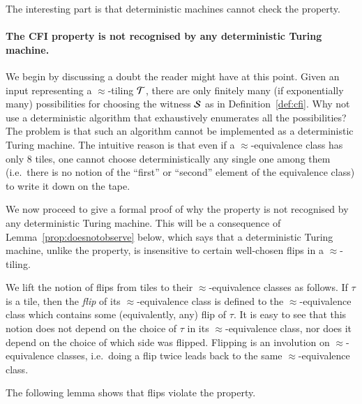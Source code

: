 The interesting part is that deterministic machines cannot check the \cfi property. 
\paragraph*{The CFI property is not recognised by any deterministic Turing machine.}
 We begin by discussing a doubt the reader might have at this point. Given an input representing a $\approx$-tiling ${\mathcal T}$, there are only finitely many (if exponentially many) possibilities for choosing the witness ${\mathcal S}$ as in Definition~\ref{def:cfi}. Why not use a deterministic algorithm that exhaustively enumerates all the possibilities? The problem is that such an algorithm cannot be implemented as a deterministic Turing machine. The intuitive reason is that even if a $\approx$-equivalence class has only 8 tiles, one cannot choose deterministically any single one among them (i.e.~there is no notion of the ``first'' or ``second'' element of the equivalence class) to write it down on the tape. 

We now proceed to give a formal proof of why the \cfi property is not recognised by any deterministic Turing machine. This will be a consequence of Lemma~\ref{prop:doesnotobserve} below, which says that a deterministic Turing machine, unlike the \cfi property, is insensitive to certain well-chosen flips in a $\approx$-tiling.

We lift the notion of flips from tiles to their $\approx$-equivalence classes as follows. If $\tau$ is a tile, then the \emph{flip} of its $\approx$-equivalence class is defined to the $\approx$-equivalence class which contains some (equivalently, any) flip of $\tau$. It is easy to see that this notion does not depend on the choice of $\tau$ in its $\approx$-equivalence class, nor does it depend on the choice of which side was flipped. Flipping is an involution on $\approx$-equivalence classes, i.e.~doing a flip twice leads back to the same $\approx$-equivalence class. 

The following lemma shows that flips violate the \cfi property.




